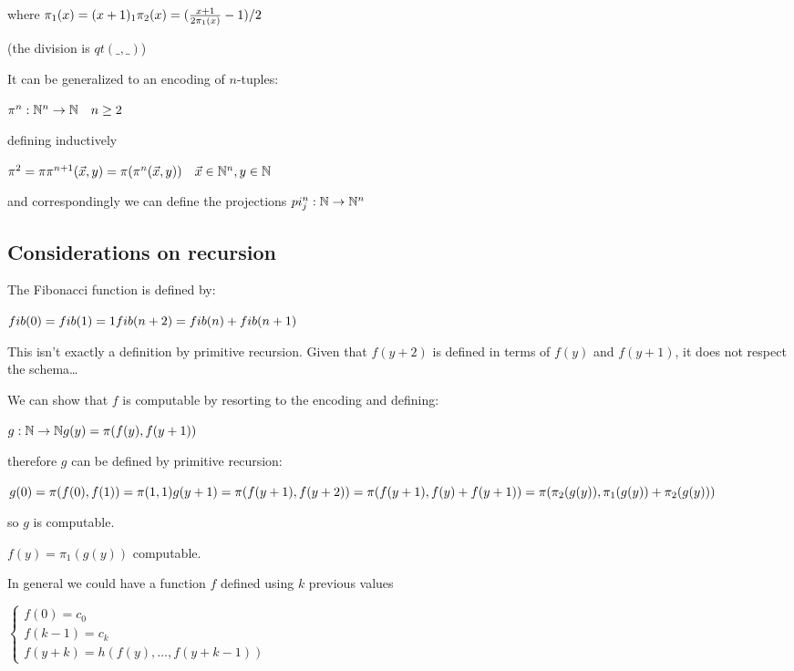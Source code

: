 where $\pi_1(x) = (x+1)_1\\
\pi_2(x) = (\frac{x+1}{2\pi_1(x)}-1)/2$

(the division is $qt(\_,\_)$)

It can be generalized to an encoding of $n$-tuples:

$\pi^n: \mathbb{N}^n\rightarrow\mathbb{N} \quad n\geq2$

defining inductively

$\pi^2 = \pi\\
\\
\pi^{n+1}(\vec{x},y) = \pi(\pi^n(\vec{x},y)) \quad \vec{x} \in \mathbb{N}^n, y \in \mathbb{N}$

and correspondingly we can define the projections $pi_j^n:\mathbb{N}\rightarrow\mathbb{N}^n$

\subsection{Considerations on recursion}

The Fibonacci function is defined by:

$ fib(0) = fib(1) = 1\\
\\
fib(n+2) = fib(n) + fib(n+1) $

This isn't exactly a definition by primitive recursion. Given that $f(y+2)$ is defined in terms of $f(y)$ and $f(y+1)$, it does not respect the schema\dots

We can show that $f$ is computable by resorting to the encoding and defining:

$g:\mathbb{N}\rightarrow\mathbb{N}\\
g(y) = \pi(f(y),f(y+1))$

therefore $g$ can be defined by primitive recursion:

$g(0) = \pi(f(0),f(1)) = \pi(1,1)\\
g(y+1) = \pi(f(y+1),f(y+2)) = \pi(f(y+1),f(y)+f(y+1))\\
= \pi(\pi_2(g(y)), \pi_1(g(y)) + \pi_2(g(y)))$

so $g$ is computable.

$f(y) = \pi_1(g(y))$ computable.

In general we could have a function $f$ defined using $k$ previous values

$\begin{cases}
  f(0) = c_0   \\
  f(k-1) = c_k \\
  f(y+k) = h(f(y),\dots,f(y+k-1))
\end{cases}$


